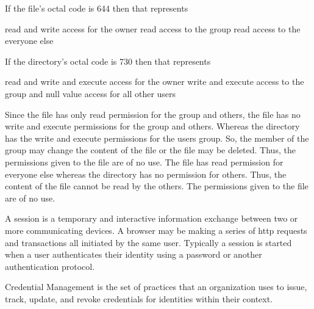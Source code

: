 \documentclass[../CIT288SecurityResearchNotebook.tex]{subfiles}
\begin{document}

If the file's octal code is 644 then that represents
\begin{outline}
	\centering
	\1 read and write access for the owner
	\1 read access to the group
	\1 read access to the everyone else
\end{outline}

If the directory's octal code is 730 then that represents
\begin{outline}
	\centering
	\1 read and write and execute access for the owner
	\1 write and execute access to the group
	\1 and null value access for all other users
\end{outline}

Since the file has only read permission for the group and others, the file has no write
and execute permissions for the group and others. Whereas the directory has the write
and execute permissions for the users group. So, the member of the group may change the
content of the file or the file may be deleted. Thus, the permissions given to the file
are of no use.
The file has read permission for everyone else whereas the directory has no permission
for others. Thus, the content of the file cannot be read by the others. The permissions
given to the file are of no use.


A session is a temporary and interactive information exchange between two or more
communicating devices. A browser may be making a series of http requests and
transactions all initiated by the same user. Typically a session is started when a user
authenticates their identity using a password or another authentication protocol.


Credential Management is the set of practices that an organization uses to issue, track,
update, and revoke credentials for identities within their context.
\end{document}
